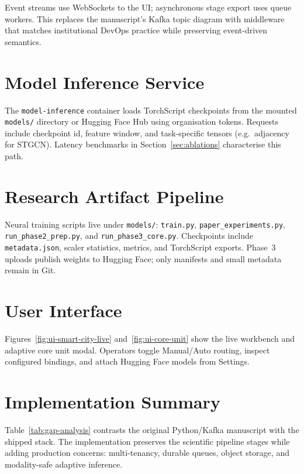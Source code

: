 Event streams use WebSockets to the UI; asynchronous stage export uses queue workers. This replaces the manuscript's Kafka topic diagram with middleware that matches institutional DevOps practice while preserving event-driven semantics.

\section{Model Inference Service}

The \texttt{model-inference} container loads TorchScript checkpoints from the mounted \texttt{models/} directory or Hugging Face Hub using organisation tokens. Requests include checkpoint id, feature window, and task-specific tensors (e.g.\ adjacency for STGCN). Latency benchmarks in Section~\ref{sec:ablations} characterise this path.

\section{Research Artifact Pipeline}

Neural training scripts live under \texttt{models/}: \texttt{train.py}, \texttt{paper\_experiments.py}, \texttt{run\_phase2\_prep.py}, and \texttt{run\_phase3\_core.py}. Checkpoints include \texttt{metadata.json}, scaler statistics, metrics, and TorchScript exports. Phase~3 uploads publish weights to Hugging Face; only manifests and small metadata remain in Git.

\section{User Interface}

Figures~\ref{fig:ui-smart-city-live} and~\ref{fig:ui-core-unit} show the live workbench and adaptive core unit modal. Operators toggle Manual/Auto routing, inspect configured bindings, and attach Hugging Face models from Settings.

\section{Implementation Summary}

Table~\ref{tab:gap-analysis} contrasts the original Python/Kafka manuscript with the shipped stack. The implementation preserves the scientific pipeline stages while adding production concerns: multi-tenancy, durable queues, object storage, and modality-safe adaptive inference.


